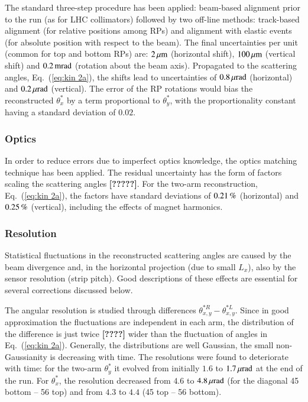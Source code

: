 The standard three-step procedure \cite{totem-ijmp} has been applied: beam-based alignment prior to the run (as for LHC collimators) followed by two off-line methods: track-based alignment (for relative positions among RPs) and alignment with elastic events (for absolute position with respect to the beam). The final uncertainties per unit (common for top and bottom RPs) are: $2\,{\rm \mu m}$ (horizontal shift), $100\,{\rm \mu m}$ (vertical shift) and $0.2\,{\rm mrad}$ (rotation about the beam axis). Propagated to the scattering angles, Eq.~(\ref{eq:kin 2a}), the shifts lead to uncertainties of $0.8\,{\rm \mu rad}$ (horizontal) and $0.2\,{\rm \mu rad}$ (vertical). The error of the RP rotations would bias the reconstructed $\theta_x^*$ by a term proportional to $\theta_y^*$, with the proportionality constant having a standard deviation of $0.02$.



\subsubsection{Optics}
\label{sec:optics}

In order to reduce errors due to imperfect optics knowledge, the optics matching technique \cite{totem-optics} has been applied. The residual uncertainty has the form of factors scaling the scattering angles \textbf{[?????]}. %
For the two-arm reconstruction, Eq.~(\ref{eq:kin 2a}), the factors have standard deviations of $0.21\,{\rm \%}$ (horizontal) and $0.25\,{\rm \%}$ (vertical), including the effects of magnet harmonics.



\subsubsection{Resolution}
\label{sec:resolution}

Statistical fluctuations in the reconstructed scattering angles are caused by 
the beam divergence and, in the horizontal projection (due to small $L_x$), 
also by the sensor resolution (strip pitch). Good descriptions of these effects
are essential for several corrections discussed below.

The angular resolution is studied through differences $\theta_{x,y}^{*R} - \theta_{x,y}^{*L}$. Since in good approximation the fluctuations are independent in each arm, the distribution of the difference is just twice \textbf{[????]} wider than the fluctuation of angles in Eq.~(\ref{eq:kin 2a}). Generally, the distributions are well Gaussian, the small non-Gaussianity is decreasing with time. The resolutions were found to deteriorate with time: for the two-arm $\theta_y^*$ it evolved from initially $1.6$ to $1.7\,{\rm \mu rad}$ at the end of the run. For $\theta_x^*$, the resolution decreased from $4.6$ to $4.8\,{\rm \mu rad}$ (for the diagonal 45 bottom -- 56 top) and from $4.3$ to $4.4$ (45 top -- 56 bottom).

